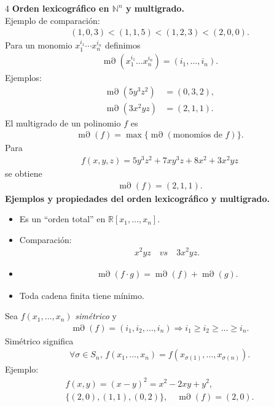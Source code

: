 \documentclass[landscape,a4paper]{article}
\begin{document}
\begin{multicols}{4}
\noindent \textbf{Orden lexicográfico en $\mathbb{N}^n$ y multigrado.}\\
Ejemplo de comparación:
\begin{align*}
(1,0,3)<(1,1,5)<(1,2,3)<(2,0,0).
\end{align*}
Para un monomio $x_1^{i_1}\cdots x_n^{i_n}$ definimos
\begin{align*}
  \operatorname{m\partial}(x_1^{i_1}\dots x_n^{i_n})=(i_1,\dots,i_n).
\end{align*}
Ejemplos:
\begin{align*}
\operatorname{m\partial}(5y^3z^2)&=(0,3,2),\\
\operatorname{m\partial}(3x^2yz)&=(2,1,1).
\end{align*}
El multigrado de un polinomio $f$ es
\begin{align*}
  \operatorname{m\partial}(f)=\max\{\operatorname{m\partial}(\text{monomios de }f)\}.
\end{align*}
Para
\begin{align*}
f(x,y,z)=5y^3z^2+7xy^3z+8x^2+3x^2yz
\end{align*}
se obtiene
\begin{align*}
  \operatorname{m\partial}(f)=(2,1,1).
\end{align*}
\noindent \textbf{Ejemplos y propiedades del orden lexicográfico y multigrado.}
\begin{itemize}
  \item Es un “orden total” en $\mathbb{R}[x_1,\dots,x_n]$.
  \item Comparación: \begin{align*} x^2y z \quad\textit{vs}\quad 3x^2y z. \end{align*}
  \item \begin{align*} \operatorname{m\partial}(f\cdot g)=\operatorname{m\partial}(f)+\operatorname{m\partial}(g). \end{align*}
  \item Toda cadena finita tiene mínimo.
\end{itemize}

\noindent Sea $f(x_1,\dots,x_n)$ \emph{simétrico} y
\begin{align*}
  \operatorname{m\partial}(f)=(i_1,i_2,\dots,i_n)\Longrightarrow i_1\ge i_2\ge\dots\ge i_n.
\end{align*}
Simétrico significa
\begin{align*}
  \forall\sigma\in S_n,\, f(x_1,\dots,x_n)=f(x_{\sigma(1)},\dots,x_{\sigma(n)}).
\end{align*}
Ejemplo:
\begin{align*}
  f(x,y)=(x-y)^2 = x^2-2xy+y^2,\\
  \{(2,0),(1,1),(0,2)\}, \quad \operatorname{m\partial}(f)=(2,0).
\end{align*}

\end{multicols}
\end{document}
